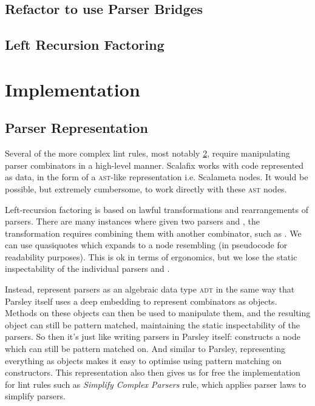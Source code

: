 \documentclass[../../main.tex]{subfiles}
\begin{document}
\section{Refactor to use Parser Bridges}

\section{Left Recursion Factoring}\label{sec:factor-leftrec}

\chapter{Implementation}
\section{Parser Representation}\label{sec:parser-representation}
Several of the more complex lint rules, most notably \cref{sec:factor-leftrec}, require manipulating parser combinators in a high-level manner.
Scalafix works with code represented as data, in the form of a \textsc{ast}-like representation i.e. Scalameta  nodes.
It would be possible, but extremely cumbersome, to work directly with these \textsc{ast} nodes.

Left-recursion factoring is based on lawful transformations and rearrangements of parsers.
There are many instances where given two parsers  and , the transformation requires combining them with another combinator, such as \scala{<*>}.
We can use quasiquotes  which expands to a  node resembling  (in pseudocode for readability purposes).
This is ok in terms of ergonomics, but we lose the static inspectability of the individual parsers  and .

Instead, represent parsers as an algebraic data type \textsc{adt} in the same way that Parsley itself uses a deep embedding to represent combinators as objects.
Methods on these objects can then be used to manipulate them, and the resulting object can still be pattern matched, maintaining the static inspectability of the parsers.
So then it's just like writing parsers in Parsley itself:  constructs a  node which can still be pattern matched on.
And similar to Parsley, representing everything as objects makes it easy to optimise using pattern matching on constructors.
This representation also then gives us for free the implementation for lint rules such as \emph{Simplify Complex Parsers} rule, which applies parser laws to simplify parsers.
\end{document}
